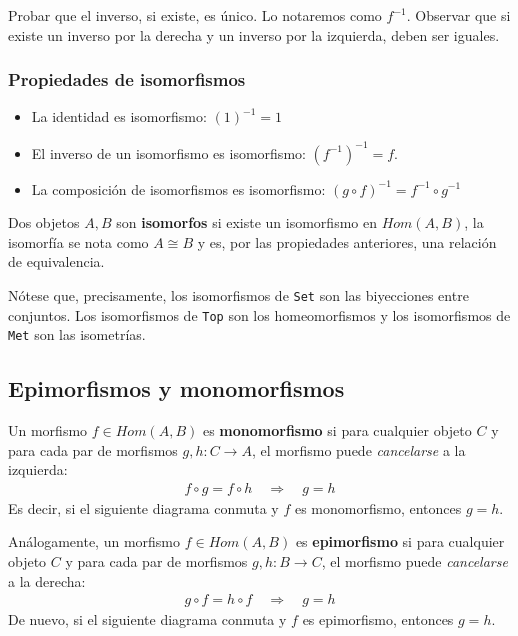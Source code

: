 \documentclass[a4paper, 11pt]{amsart}
\theoremstyle{definition}
\theoremstyle{remark}
\numberwithin{equation}{section}
\begin{document}
    
    \exca Probar que el inverso, si existe, es único. Lo notaremos como $f^{-1}$. Observar que si
    existe un inverso por la derecha y un inverso por la izquierda, deben ser iguales.
    
    \subsubsection{Propiedades de isomorfismos}
      \begin{itemize}
       \item La identidad es isomorfismo: $(1)^{-1} = 1$ 
       \item El inverso de un isomorfismo es isomorfismo: $(f^{-1})^{-1} = f$.
       \item La composición de isomorfismos es isomorfismo: $(g \circ f)^{-1} = f^{-1} \circ g^{-1}$
      \end{itemize}

    Dos objetos $A,B$ son \textbf{isomorfos} si existe un isomorfismo en $Hom(A,B)$, la isomorfía se
    nota como $A \cong B$ y es, por las propiedades anteriores, una relación de equivalencia.
      
    Nótese que, precisamente, los isomorfismos de \texttt{Set} son las biyecciones entre conjuntos.
    Los isomorfismos de \texttt{Top} son los homeomorfismos y los isomorfismos de \texttt{Met} son
    las isometrías.
    
  \subsection {Epimorfismos y monomorfismos}
     Un morfismo $f \in Hom(A,B)$ es \textbf{monomorfismo} si para cualquier objeto $C$ y
    para cada par de morfismos $g,h: C \rightarrow A$, el morfismo puede \textit{cancelarse} a la izquierda:
    \begin{gather*}
     f \circ g = f \circ h \quad \Rightarrow \quad g = h
    \end{gather*}
    Es decir, si el siguiente diagrama conmuta y $f$ es monomorfismo, entonces $g=h$.
    \begin{center}
    \end{center}
    
     Análogamente, un morfismo $f \in Hom(A,B)$ es \textbf{epimorfismo} si para cualquier objeto $C$ y
    para cada par de morfismos $g,h: B \rightarrow C$, el morfismo puede \textit{cancelarse} a la derecha:
    \begin{gather*}
     g \circ f = h \circ f \quad \Rightarrow \quad g = h
    \end{gather*}
    De nuevo, si el siguiente diagrama conmuta y $f$ es epimorfismo, entonces $g=h$.
    \begin{center}
    \end{center}
    
\end{document}
